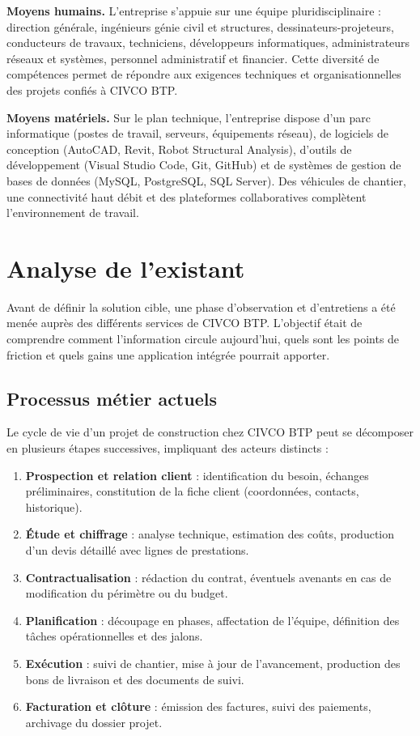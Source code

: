 \textbf{Moyens humains.} L'entreprise s'appuie sur une équipe pluridisciplinaire :
direction générale, ingénieurs génie civil et structures, dessinateurs-projeteurs,
conducteurs de travaux, techniciens, développeurs informatiques, administrateurs réseaux
et systèmes, personnel administratif et financier. Cette diversité de compétences permet
de répondre aux exigences techniques et organisationnelles des projets confiés à CIVCO BTP.

\medskip

\textbf{Moyens matériels.} Sur le plan technique, l'entreprise dispose d'un parc
informatique (postes de travail, serveurs, équipements réseau), de logiciels de conception
(AutoCAD, Revit, Robot Structural Analysis), d'outils de développement (Visual Studio Code,
Git, GitHub) et de systèmes de gestion de bases de données (MySQL, PostgreSQL, SQL Server).
Des véhicules de chantier, une connectivité haut débit et des plateformes collaboratives
complètent l'environnement de travail.

\section{Analyse de l'existant}

Avant de définir la solution cible, une phase d'observation et d'entretiens a été
menée auprès des différents services de CIVCO BTP. L'objectif était de comprendre
comment l'information circule aujourd'hui, quels sont les points de friction et
quels gains une application intégrée pourrait apporter.

\subsection{Processus métier actuels}

Le cycle de vie d'un projet de construction chez CIVCO BTP peut se décomposer en
plusieurs étapes successives, impliquant des acteurs distincts :

\begin{enumerate}
  \item \textbf{Prospection et relation client} : identification du besoin, échanges
  préliminaires, constitution de la fiche client (coordonnées, contacts, historique).
  \item \textbf{Étude et chiffrage} : analyse technique, estimation des coûts,
  production d'un devis détaillé avec lignes de prestations.
  \item \textbf{Contractualisation} : rédaction du contrat, éventuels avenants en cas
  de modification du périmètre ou du budget.
  \item \textbf{Planification} : découpage en phases, affectation de l'équipe,
  définition des tâches opérationnelles et des jalons.
  \item \textbf{Exécution} : suivi de chantier, mise à jour de l'avancement,
  production des bons de livraison et des documents de suivi.
  \item \textbf{Facturation et clôture} : émission des factures, suivi des paiements,
  archivage du dossier projet.
\end{enumerate}

